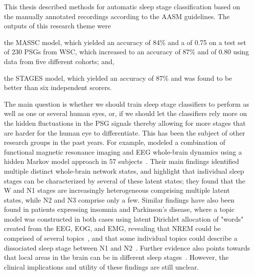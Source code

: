 This thesis described methods for automatic sleep stage classification based on the manually annotated recordings according to the \ac{AASM} guidelines.
The outputs of this research theme were 
\begin{enumerate*}[label=\arabic*)]
    \item the \ac{MASSC} model, which yielded an accuracy of 84\% and a \cohen of 0.75 on a test set of 230 \acp{PSG} from \ac{WSC}, which increased to an accuracy of 87\% and \cohen of 0.80 using data from five different cohorts; and,
    \item the \ac{STAGES} model, which yielded an accuracy of 87\% and was found to be better than six independent scorers.
\end{enumerate*}
The main question is whether we should train sleep stage classifiers to perform as well as one or several human eyes, or, if we should let the classifiers rely more on the hidden fluctuations in the \ac{PSG} signals thereby allowing for more stages that are harder for the human eye to differentiate.
This has been the subject of other research groups in the past years. 
For example, \citeauthor{Stevner2019} modeled a combination of functional magnetic resonance imaging and \ac{EEG} whole-brain dynamics using a hidden Markov model approach in 57 subjects~\cite{Stevner2019}.
Their main findings identified multiple distinct whole-brain network states, and highlight that individual sleep stages can be characterized by several of these latent states; \eg they found that the \ac{W} and \ac{N1} stages are increasingly heterogeneous comprising multiple latent states, while \ac{N2} and \ac{N3} comprise only a few. 
Similar findings have also been found in patients expressing insomnia and Parkinson's disease, where a topic model was constructed in both cases using latent Dirichlet allocation of "words" created from the \ac{EEG}, \ac{EOG}, and \ac{EMG}, revealing that \ac{NREM} could be comprised of several topics~\cite{Koch2014, Christensen2019}, and that some individual topics could describe a dissociated sleep stage \eg between \ac{N1} and \ac{N2}~\cite{Christensen2014}. 
Further evidence also points towards that local areas in the brain can be in different sleep stages~\cite{Koch2019}.
However, the clinical implications and utility of these findings are still unclear.

